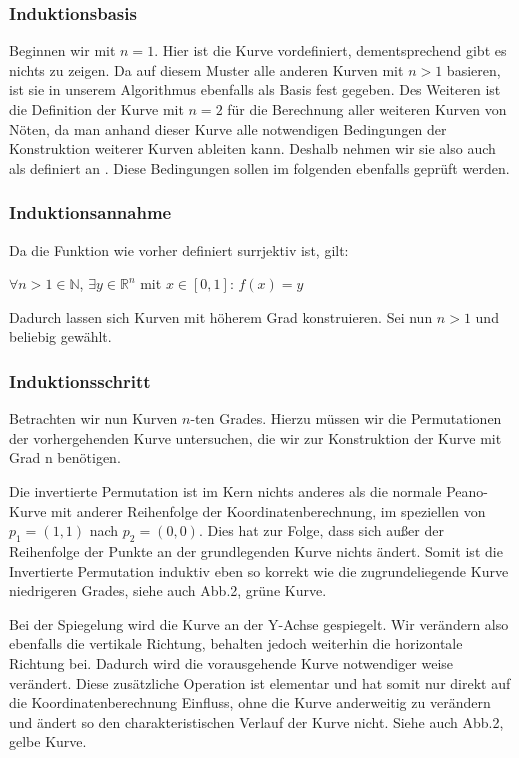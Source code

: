 \documentclass[course=asp]{aspdoc}
\begin{document}
\subsubsection{Induktionsbasis}
Beginnen wir mit $n = 1$. Hier ist die Kurve vordefiniert, dementsprechend gibt es nichts zu zeigen. Da auf diesem Muster alle anderen Kurven mit $n > 1$ basieren, ist sie in unserem Algorithmus ebenfalls als Basis fest gegeben.
Des Weiteren ist die Definition der Kurve mit $n = 2$ f\"ur die Berechnung aller weiteren Kurven von N\"oten, da man anhand dieser Kurve alle notwendigen Bedingungen der Konstruktion weiterer Kurven ableiten kann. Deshalb nehmen wir sie also auch als definiert an \cite{aufgabenstellung}. Diese Bedingungen sollen im folgenden ebenfalls gepr\"uft werden.

\subsubsection{Induktionsannahme}
Da die Funktion wie vorher definiert surrjektiv ist, gilt:

\begin{center}
$\forall n > 1 \in \mathbb{N}$, $\exists y \in \mathbb{R}^n$ mit $x \in [0,1]$: $f(x)= y$	%
\end{center}

Dadurch lassen sich Kurven mit h\"oherem Grad konstruieren. Sei nun $n > 1$ und beliebig gew\"ahlt.

\subsubsection{Induktionsschritt}
Betrachten wir nun Kurven $n$-ten Grades. Hierzu m\"ussen wir die Permutationen der vorhergehenden Kurve untersuchen, die wir zur Konstruktion der Kurve mit Grad n ben\"otigen.	

Die invertierte Permutation ist im Kern nichts anderes als die normale Peano-Kurve mit anderer Reihenfolge der Koordinatenberechnung, im speziellen von $p_1=(1,1)$ nach $p_2 = (0,0)$. Dies hat zur Folge, dass sich außer der Reihenfolge der Punkte an der grundlegenden Kurve nichts \"andert. Somit ist die Invertierte Permutation induktiv eben so korrekt wie die zugrundeliegende Kurve niedrigeren Grades, siehe auch Abb.2, gr\"une Kurve.

Bei der Spiegelung wird die Kurve an der Y-Achse gespiegelt. Wir ver\"andern also ebenfalls die vertikale Richtung, behalten jedoch weiterhin die horizontale Richtung bei. Dadurch wird die vorausgehende Kurve notwendiger weise ver\"andert. Diese zus\"atzliche Operation ist elementar und hat somit nur direkt auf die Koordinatenberechnung Einfluss, ohne die Kurve anderweitig zu ver\"andern und \"andert so den charakteristischen Verlauf der Kurve nicht. Siehe auch Abb.2, gelbe Kurve.
\end{document}
